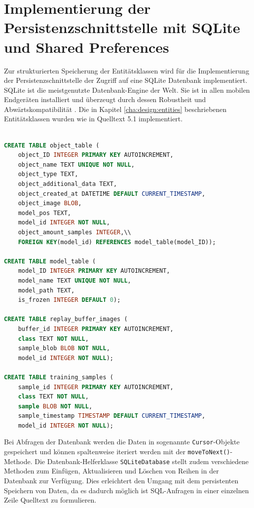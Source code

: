 \documentclass[oneside]{ausarbeitung}
\begin{document}
\section{Implementierung der Persistenzschnittstelle mit SQLite und Shared Preferences}
Zur strukturierten Speicherung der Entitätsklassen wird für die Implementierung der Persistenzschnittstelle der Zugriff auf eine SQLite Datenbank implementiert. SQLite ist die meistgenutzte Datenbank-Engine der Welt. Sie ist in allen mobilen Endgeräten installiert und überzeugt durch dessen Robustheit und Abwärtskompatibilität \cite{sqlite-documentation}. Die in Kapitel \ref{cha:design:entities} beschriebenen Entitätsklassen wurden wie in Quelltext 5.1 implementiert.\\ \\
\begin{minipage}{\linewidth}
\begin{lstlisting}[language=SQL, breaklines=true, caption={SQLite Statements zum Erstellen der Tabellen}]
CREATE TABLE object_table (
	object_ID INTEGER PRIMARY KEY AUTOINCREMENT,
	object_name TEXT UNIQUE NOT NULL,
	object_type TEXT,
	object_additional_data TEXT,
	object_created_at DATETIME DEFAULT CURRENT_TIMESTAMP,
	object_image BLOB,
	model_pos TEXT,
	model_id INTEGER NOT NULL,
	object_amount_samples INTEGER,\\
	FOREIGN KEY(model_id) REFERENCES model_table(model_ID));

CREATE TABLE model_table (
	model_ID INTEGER PRIMARY KEY AUTOINCREMENT,
	model_name TEXT UNIQUE NOT NULL,
	model_path TEXT,
	is_frozen INTEGER DEFAULT 0);

CREATE TABLE replay_buffer_images (
	buffer_id INTEGER PRIMARY KEY AUTOINCREMENT,
	class TEXT NOT NULL, 
	sample_blob BLOB NOT NULL,
	model_id INTEGER NOT NULL);
	
CREATE TABLE training_samples (
	sample_id INTEGER PRIMARY KEY AUTOINCREMENT,
	class TEXT NOT NULL,
	sample BLOB NOT NULL,
	sample_timestamp TIMESTAMP DEFAULT CURRENT_TIMESTAMP,
	model_id INTEGER NOT NULL);
\end{lstlisting}
\label{lst:sql-statements}
\end{minipage}
Bei Abfragen der Datenbank werden die Daten in sogenannte \texttt{Cursor}-Objekte gespeichert und können spaltenweise iteriert werden mit der \texttt{moveToNext()}-Methode. Die Datenbank-Helferklasse \texttt{SQLiteDatabase} stellt zudem verschiedene Methoden zum Einfügen, Aktualisieren und Löschen von Reihen in der Datenbank zur Verfügung. Dies erleichtert den Umgang mit dem persistenten Speichern von Daten, da es dadurch möglich ist SQL-Anfragen in einer einzelnen Zeile Quelltext zu formulieren.\\
\end{document}
